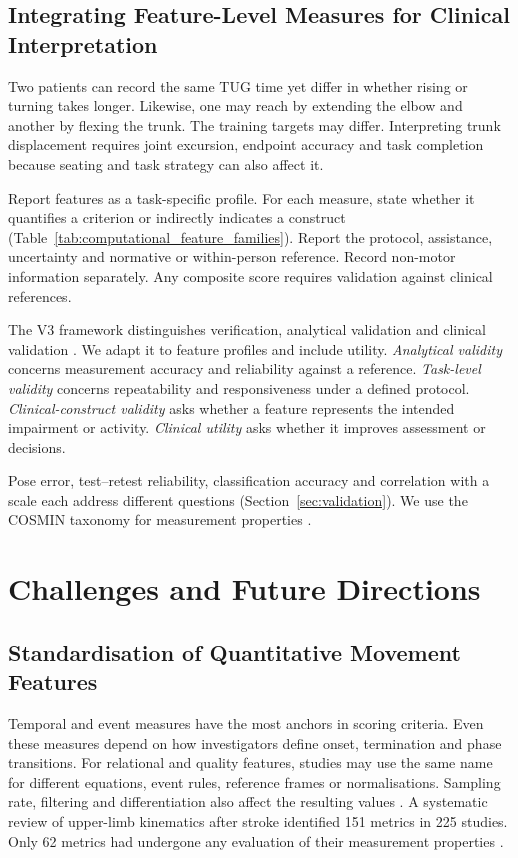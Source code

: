 \documentclass[11pt]{article}
\begin{document}
\subsection{Integrating Feature-Level Measures for Clinical Interpretation}
Two patients can record the same TUG time yet differ in whether rising or turning takes longer. Likewise, one may reach by extending the elbow and another by flexing the trunk. The training targets may differ. Interpreting trunk displacement requires joint excursion, endpoint accuracy and task completion because seating and task strategy can also affect it.

Report features as a task-specific profile. For each measure, state whether it quantifies a criterion or indirectly indicates a construct (Table~\ref{tab:computational_feature_families}). Report the protocol, assistance, uncertainty and normative or within-person reference. Record non-motor information separately. Any composite score requires validation against clinical references.

The V3 framework distinguishes verification, analytical validation and clinical validation \cite{Goldsack2020V3}. We adapt it to feature profiles and include utility. \emph{Analytical validity} concerns measurement accuracy and reliability against a reference. \emph{Task-level validity} concerns repeatability and responsiveness under a defined protocol. \emph{Clinical-construct validity} asks whether a feature represents the intended impairment or activity. \emph{Clinical utility} asks whether it improves assessment or decisions.

Pose error, test--retest reliability, classification accuracy and correlation with a scale each address different questions (Section~\ref{sec:validation}). We use the COSMIN taxonomy for measurement properties \cite{Mokkink2010COSMINTaxonomy}.

\section{Challenges and Future Directions}
\label{sec:challenge}

\subsection{Standardisation of Quantitative Movement Features}

Temporal and event measures have the most anchors in scoring criteria. Even these measures depend on how investigators define onset, termination and phase transitions. For relational and quality features, studies may use the same name for different equations, event rules, reference frames or normalisations. Sampling rate, filtering and differentiation also affect the resulting values \cite{Jung2017MovementQuality,Proffitt2023DepthMovement,Yang2013SpatiotemporalGait,S3Stenum202438530801}. A systematic review of upper-limb kinematics after stroke identified 151 metrics in 225 studies. Only 62 metrics had undergone any evaluation of their measurement properties \cite{Schwarz2019UpperLimbKinematicsSR}.
\end{document}
